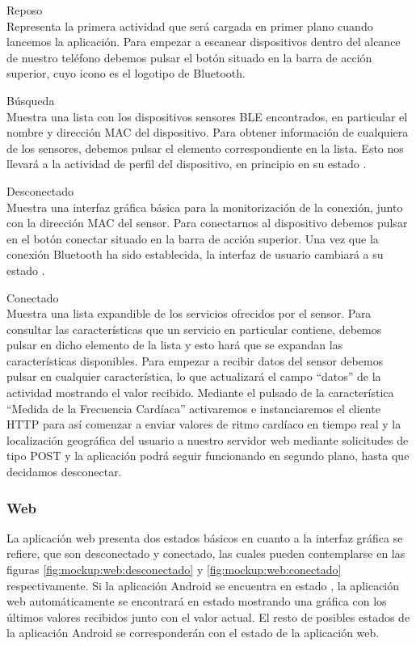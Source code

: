 \begin{description}
\item Reposo\hfill \\
Representa la primera actividad que será cargada en primer plano cuando lancemos la aplicación. Para empezar a escanear dispositivos dentro del alcance de nuestro teléfono debemos pulsar el botón situado en la barra de acción superior, cuyo icono es el logotipo de Bluetooth.
\item Búsqueda\hfill \\
Muestra una lista con los dispositivos sensores BLE encontrados, en particular el nombre y dirección \ac{MAC} del dispositivo. Para obtener información de cualquiera de los sensores, debemos pulsar el elemento correspondiente en la lista. Esto nos llevará a la actividad de perfil del dispositivo, en principio en su estado .
\item Desconectado\hfill \\
 Muestra una interfaz gráfica básica para la monitorización de la conexión, junto con la dirección \ac{MAC} del sensor. Para conectarnos al dispositivo debemos pulsar en el botón conectar situado en la barra de acción superior. Una vez que la conexión Bluetooth ha sido establecida, la interfaz de usuario cambiará a su estado .
\item Conectado\hfill \\
 Muestra una lista expandible de los servicios ofrecidos por el sensor. Para consultar las características que un servicio en particular contiene, debemos pulsar en dicho elemento de la lista y esto hará que se expandan las características disponibles. Para empezar a recibir datos del sensor debemos pulsar en cualquier característica, lo que actualizará el campo ``datos'' de la actividad mostrando el valor recibido. Mediante el pulsado de la característica ``Medida de la Frecuencia Cardíaca'' activaremos e instanciaremos el cliente HTTP para así comenzar a enviar valores de ritmo cardíaco en tiempo real y la localización geográfica del usuario a nuestro servidor web mediante solicitudes de tipo POST y la aplicación podrá seguir funcionando en segundo plano, hasta que decidamos desconectar.
\end{description} 

\subsubsection{Web}
La aplicación web presenta dos estados básicos en cuanto a la interfaz gráfica se refiere, que son desconectado y conectado,  las cuales pueden contemplarse en las figuras \ref{fig:mockup:web:desconectado} y \ref{fig:mockup:web:conectado} respectivamente. Si la aplicación Android se encuentra en estado , la aplicación web automáticamente se encontrará en estado  mostrando una gráfica con los últimos valores recibidos junto con el valor actual. El resto de posibles estados de la aplicación Android se corresponderán con el estado  de la aplicación web.

